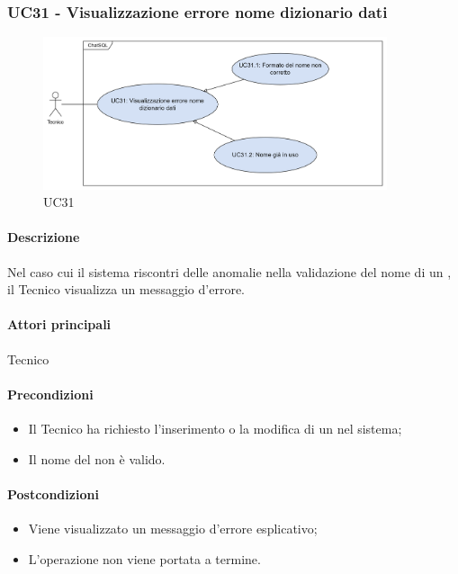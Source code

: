 \subsubsection{UC31 - Visualizzazione errore nome dizionario dati}\label{UC31}

\begin{figure}[H]
  \centering
  \includegraphics[width=0.90\textwidth]{assets/uc31.png}
  \caption{UC31}
\end{figure}

\paragraph*{Descrizione}
Nel caso cui il sistema riscontri delle anomalie nella validazione del nome di un , il Tecnico visualizza un messaggio d'errore.

\paragraph*{Attori principali}
Tecnico

\paragraph*{Precondizioni}
\begin{itemize}
  \item Il Tecnico ha richiesto l'inserimento o la modifica di un  nel sistema;
  \item Il nome del  non è valido.
\end{itemize}

\paragraph*{Postcondizioni}
\begin{itemize}
  \item Viene visualizzato un messaggio d'errore esplicativo;
  \item L'operazione non viene portata a termine.
\end{itemize}

